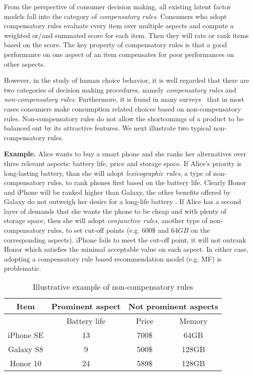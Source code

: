 \documentclass[letterpaper]{article} %
\begin{document}
From the perspective of consumer decision making, all existing latent factor models fall into the category of \emph{compensatory rules}. Consumers who adopt compensatory rules evaluate every item over multiple aspects and compute a weighted or/and summated score for each item. Then they will rate or rank items based on the score. The key property of compensatory rules is that a good performance on one aspect of an item compensates for poor performances on other aspects. 


However, in the study of human choice behavior, it is well regarded that there are two categories of decision making procedures, namely \emph{compensatory rules} and \emph{non-compensatory rules}. Furthermore, it is found in many surveys~\cite{Engel1986Consumer} that in most cases consumers make consumption related choices based on non-compensatory rules. Non-compensatory rules do not allow the shortcomings of a product to be balanced out by its attractive features. We next illustrate two typical non-compensatory rules.

\textbf{Example.} Alice wants to buy a smart phone and she ranks her alternatives over three relevant aspects: battery life, price and storage space. If Alice's priority is long-lasting battery, than she will adopt \emph{lexicographic rules}, a type of non-compensatory rules, to rank phones first based on the battery life. Clearly Honor and iPhone will be ranked higher than Galaxy, the other benefits offered by Galaxy  do not outweigh her desire for a long-life battery . If Alice has a second layer of demands that she wants the phone to be cheap and with plenty of storage space, then she will adopt \emph{conjunctive rules}, another type of non-compensatory rules, to set cut-off points (e.g. $600\$$ and $64GB$ on the corresponding aspects). iPhone fails to meet the cut-off point, it will not outrank Honor which satisfies the minimal acceptable value on each aspect. In either case, adopting a compensatory rule based recommendation model (e.g. MF) is problematic. 

\begin{table}[htp]\label{tab:rules}
\caption{Illustrative example of non-compensatory rules}
\begin{center}
\begin{tabular}{|c|c|c|c|}
\hline
Item & Prominent aspect & \multicolumn{2}{|c|}{Not prominent aspects}\\\hline
& Battery life &  Price & Memory \\\hline
iPhone SE &  13 & 700$\$$ & 64GB  \\\hline
Galaxy S8 & 9 & 500$\$$  & 128GB \\\hline
Honor 10 & 24 & 589$\$$ & 128GB \\\hline
\end{tabular}
\end{center}
\label{default}
\end{table}%
\end{document}
